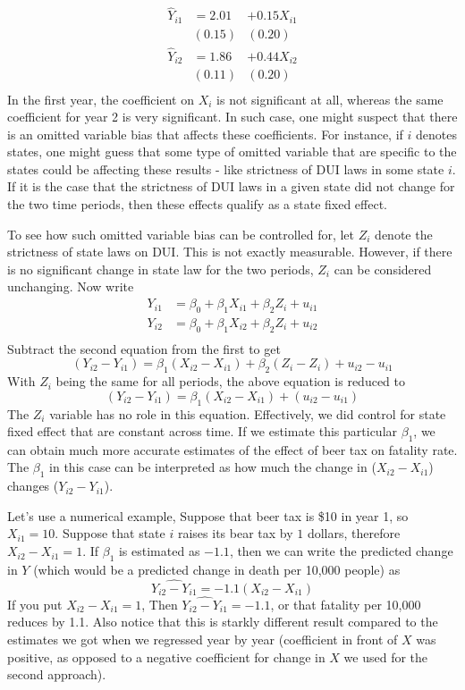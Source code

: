 \documentclass[12pt]{article}
\theoremstyle{definition}
\theoremstyle{property}
\theoremstyle{assumption}
\theoremstyle{example}
\theoremstyle{comment}
\begin{document}
\[
\begin{aligned}
\hat{Y}_{i1} &=2.01 &+ 0.15X_{i1}\\
                    &(0.15)&(0.20) \\
\hat{Y}_{i2} &=1.86 &+ 0.44X_{i2}\\
                    &(0.11)&(0.20) \\                    
\end{aligned}
\]
In the first year, the coefficient on $X_i$ is not significant at all, whereas the same coefficient for year 2 is very significant. In such case, one might suspect that there is an omitted variable bias that affects these coefficients. For instance, if $i$ denotes states, one might guess that some type of omitted variable that are specific to the states could be affecting these results - like strictness of DUI laws in some state $i$. If it is the case that the strictness of DUI laws in a given state did not change for the two time periods, then these effects qualify as a state fixed effect. \par\medskip 
To see how such omitted variable bias can be controlled for, let $Z_i$ denote the strictness of state laws on DUI. This is not exactly measurable. However, if there is no significant change in state law for the two periods, $Z_i$ can be considered unchanging. Now write
\[
\begin{aligned}
Y_{i1}& = \beta_0 + \beta_1X_{i1}+\beta_2 Z_{i}+u_{i1} \\                
Y_{i2}& = \beta_0 + \beta_1X_{i2}+\beta_2 Z_{i}+u_{i2} \\                
\end{aligned}
\]
Subtract the second equation from the first to get
\[
(Y_{i2}-Y_{i1}) = \beta_1(X_{i2}-X_{i1}) +\beta_2(Z_{i}-Z_{i}) + u_{i2}-u_{i1}
\]
With $Z_i$ being the same for all periods, the above equation is reduced to
\[
(Y_{i2}-Y_{i1}) = \beta_1(X_{i2}-X_{i1}) +(u_{i2}-u_{i1})
\]
The $Z_i$ variable has no role in this equation. Effectively, we did control for state fixed effect that are constant across time. If we estimate this particular $\beta_1$, we can obtain much more accurate estimates of the effect of beer tax on fatality rate. The $\beta_1$ in this case can be interpreted as how much the change in ($X_{i2}-X_{i1}$) changes ($Y_{i2}-Y_{i1}$). \par\medskip
Let's use a numerical example, Suppose that beer tax is \$10 in year 1, so $X_{i1}=10$. Suppose that state $i$ raises its bear tax by $1$ dollars, therefore $X_{i2}-X_{i1}=1$. If $\beta_1$ is estimated as  $-1.1$, then we can write the predicted change in $Y$ (which would be a predicted change in death per 10,000 people) as
\[
\widehat{Y_{i2}-Y_{i1}} = -1.1(X_{i2}-X_{i1})
\]
If you put  $X_{i2}-X_{i1}=1$, Then $\widehat{Y_{i2}-Y_{i1}} = -1.1$, or that fatality per 10,000 reduces by 1.1. Also notice that this is starkly different result compared to the estimates we got when we regressed year by year (coefficient in front of $X$ was positive, as opposed to a negative coefficient for change in $X$ we used for the second approach). \par\medskip
\end{document}
